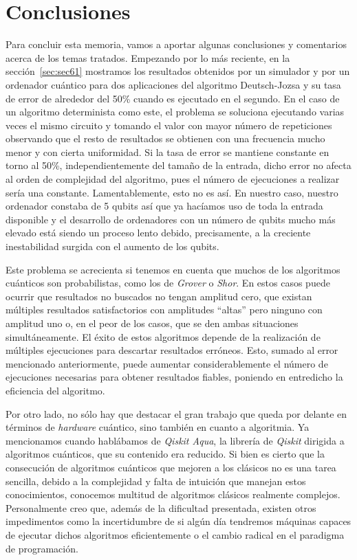 \chapter{Conclusiones}
\label{chapter7}

Para concluir esta memoria, vamos a aportar algunas conclusiones y comentarios acerca de los temas tratados.
%
Empezando por lo más reciente, en la sección~\ref{sec:sec61} mostramos  los resultados obtenidos por un simulador y por un ordenador cuántico para dos aplicaciones del algoritmo Deutsch-Jozsa y su tasa de error de alrededor del 50\% cuando es ejecutado en el segundo. En el caso de un algoritmo determinista como este, el problema se soluciona ejecutando varias veces el mismo circuito y tomando el valor con mayor número de repeticiones observando que el resto de resultados se obtienen con una frecuencia mucho menor y con cierta uniformidad. Si la tasa de error se mantiene constante en torno al 50\%, independientemente del tamaño de la entrada, dicho error no afecta al orden de complejidad del algoritmo, pues el número de ejecuciones a realizar sería una constante. Lamentablemente, esto no es así. En nuestro caso, nuestro ordenador constaba de 5 qubits así que ya hacíamos uso de toda la entrada disponible y el desarrollo de ordenadores con un número de qubits mucho más elevado está siendo un proceso lento debido, precisamente, a la creciente inestabilidad surgida con el aumento de los qubits.

Este problema se acrecienta si tenemos en cuenta que muchos de los algoritmos cuánticos son probabilistas, como los de \textit{Grover} o \textit{Shor}. En estos casos puede ocurrir que  resultados no buscados no tengan amplitud cero,  que existan múltiples resultados satisfactorios con amplitudes ``altas'' pero ninguno con amplitud uno o, en el peor de los casos, que se den ambas situaciones simultáneamente. El éxito de estos algoritmos depende de la realización de múltiples ejecuciones para descartar resultados erróneos. Esto, sumado al error mencionado anteriormente, puede aumentar considerablemente el número de ejecuciones necesarias para obtener resultados fiables, poniendo en entredicho la eficiencia del algoritmo.

Por otro lado, no sólo hay que destacar el gran trabajo que queda por delante en términos de \textit{hardware} cuántico, sino también en cuanto a algoritmia. Ya mencionamos cuando hablábamos de \textit{Qiskit Aqua}, la librería de \textit{Qiskit} dirigida a algoritmos cuánticos, que su contenido era reducido. Si bien es cierto que la consecución de algoritmos cuánticos que mejoren a los clásicos no es una tarea sencilla, debido a la complejidad y falta de intuición que manejan estos conocimientos, conocemos multitud de algoritmos clásicos realmente complejos. Personalmente creo que, además de la dificultad presentada, existen otros impedimentos como la incertidumbre de si algún día tendremos máquinas capaces de ejecutar dichos algoritmos eficientemente o el cambio radical en el paradigma de programación.

